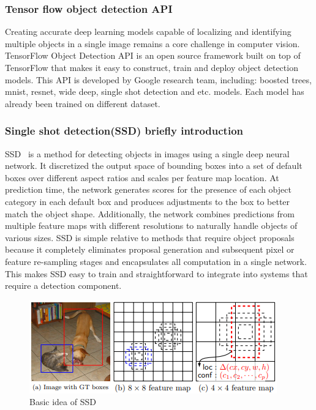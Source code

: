 \documentclass[10pt,twocolumn,letterpaper]{article}
\begin{document}
\subsubsection{Tensor flow object detection API}

Creating accurate deep learning models capable of localizing and identifying multiple objects in a single image remains a core challenge in computer vision. TensorFlow Object Detection API is an open source framework built on top of TensorFlow that makes it easy to construct, train and deploy object detection models. This API is developed by Google research team, including: boosted trees, mnist, resnet, wide deep, single shot detection and etc. models. Each model has already been trained on different dataset.

\subsubsection{Single shot detection(SSD) briefly introduction}

SSD~\cite{SSD} is a method for detecting objects in images using a single
deep neural network. It discretized the output space of
bounding boxes into a set of default boxes over different aspect ratios and scales
per feature map location. At prediction time, the network generates scores for the
presence of each object category in each default box and produces adjustments to
the box to better match the object shape. Additionally, the network combines predictions
from multiple feature maps with different resolutions to naturally handle
objects of various sizes. SSD is simple relative to methods that require object
proposals because it completely eliminates proposal generation and subsequent
pixel or feature re-sampling stages and encapsulates all computation in a single
network. This makes SSD easy to train and straightforward to integrate into systems
that require a detection component. 
\begin{figure}[t]
\begin{center}
   \includegraphics[width=1\linewidth]{model1}
\end{center}
   \caption{Basic idea of SSD}
\label{fig:2_1_1}
\end{figure}
\end{document}
